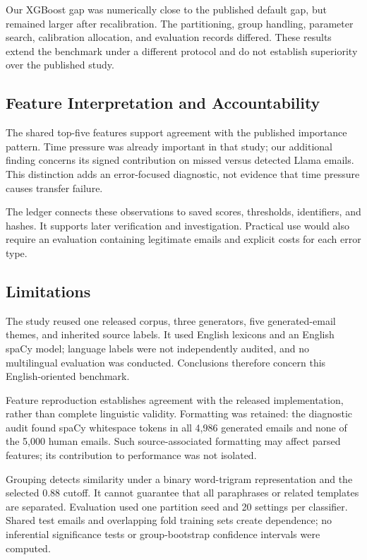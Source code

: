 \documentclass[conference]{IEEEtran}
\begin{document}
Our XGBoost gap was numerically close to the published default
gap, but remained larger after recalibration.
The partitioning, group handling, parameter search,
calibration allocation, and evaluation records differed.
These results extend the benchmark under a different protocol
and do not establish superiority over the published study.

\subsection{Feature Interpretation and Accountability}

The shared top-five features support agreement with the
published importance pattern. Time pressure was already
important in that study; our additional finding concerns
its signed contribution on missed versus detected Llama
emails. This distinction adds an error-focused diagnostic,
not evidence that time pressure causes transfer failure.

The ledger connects these observations to saved scores,
thresholds, identifiers, and hashes. It supports later
verification and investigation. Practical use would also
require an evaluation containing legitimate emails and
explicit costs for each error type.

\subsection{Limitations}

The study reused one released corpus, three generators,
five generated-email themes, and inherited source labels.
It used English lexicons and an English spaCy model;
language labels were not independently audited, and no
multilingual evaluation was conducted. Conclusions therefore
concern this English-oriented benchmark.

Feature reproduction establishes agreement with the released
implementation, rather than complete linguistic validity.
Formatting was retained: the diagnostic audit found spaCy
whitespace tokens in all 4,986 generated emails and none
of the 5,000 human emails. Such source-associated formatting
may affect parsed features; its contribution to performance
was not isolated.

Grouping detects similarity under a binary word-trigram
representation and the selected 0.88 cutoff. It cannot
guarantee that all paraphrases or related templates are
separated. Evaluation used one partition seed and 20 settings
per classifier. Shared test emails and overlapping fold
training sets create dependence; no inferential significance
tests or group-bootstrap confidence intervals were computed.
\end{document}
